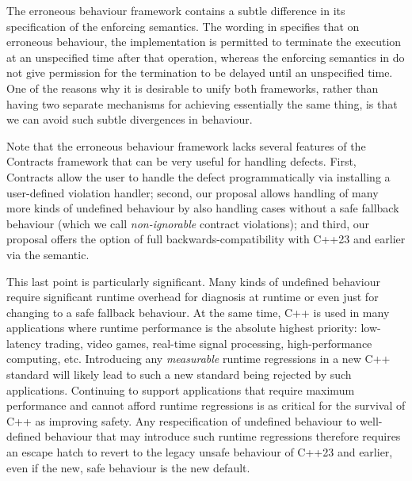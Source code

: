 The erroneous behaviour framework contains a subtle difference in its specification of the enforcing semantics. The wording in \cite{P2795R5} specifies that on erroneous behaviour, the implementation is permitted to terminate the execution at an unspecified time after that operation, whereas the enforcing semantics in \cite{P2900R7} do not give permission for the termination to be delayed until an unspecified time. One of the reasons why it is desirable to unify both frameworks, rather than having two separate mechanisms for achieving essentially the same thing, is that we can avoid such subtle divergences in behaviour.

Note that the erroneous behaviour framework lacks several features of the Contracts framework that can be very useful for handling defects. First, Contracts allow the user to handle the defect programmatically via installing a user-defined violation handler; second, our proposal allows handling of many more kinds of undefined behaviour by also handling cases without a safe fallback behaviour (which we call \emph{non-ignorable} contract violations); and third, our proposal offers the option of full backwards-compatibility with C++23 and earlier via the  semantic.

This last point is particularly significant. Many kinds of undefined behaviour require significant runtime overhead for diagnosis at runtime or even just for changing to a safe fallback behaviour. At the same time, C++ is used in many applications where runtime performance is the absolute highest priority: low-latency trading, video games, real-time signal processing, high-performance computing, etc. Introducing any \emph{measurable} runtime regressions in a new C++ standard will likely lead to such a new standard being rejected by such applications. Continuing to support applications that require maximum performance and cannot afford runtime regressions is as critical for the survival of C++ as improving safety. Any respecification of undefined behaviour to well-defined behaviour that may introduce such runtime regressions therefore requires an escape hatch to revert to the legacy unsafe behaviour of C++23 and earlier, even if the new, safe behaviour is the new default.

